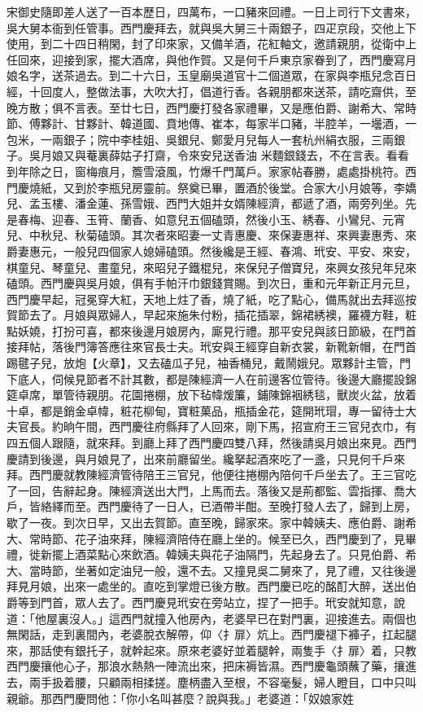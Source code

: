 宋御史隨即差人送了一百本歷日，四萬布，一口豬來回禮。一日上司行下文書來，吳大舅本衙到任管事。西門慶拜去，就與吳大舅三十兩銀子，四疋京段，交他上下使用，到二十四日稍閑，封了印來家，又備羊酒，花紅軸文，邀請親朋，從衛中上任回來，迎接到家，擺大酒席，與他作賀。又是何千戶東京家眷到了，西門慶寫月娘名字，送茶過去。到二十六日，玉皇廟吳道官十二個道眾，在家與李瓶兒念百日經，十回度人，整做法事，大吹大打，倡道行香。各親朋都來送茶，請吃齋供，至晚方散；俱不言表。至廿七日，西門慶打發各家禮畢，又是應伯爵、謝希大、常時節、傅夥計、甘夥計、韓道國、賁地傳、崔本，每家半口豬，半腔羊，一壜酒，一包米，一兩銀子；院中李桂姐、吳銀兒、鄭愛月兒每人一套杭州絹衣服，三兩銀子。吳月娘又與菴裏薛姑子打齋，令來安兒送香油 米麵銀錢去，不在言表。看看到年除之日，窗梅痕月，簷雪滾風，竹爆千門萬戶。家家帖春勝，處處掛桃符。西門慶燒紙，又到於李瓶兒房靈前。祭奠已畢，置酒於後堂。合家大小月娘等，李嬌兒、孟玉樓、潘金蓮、孫雪娥、西門大姐并女婿陳經濟，都遞了酒，兩旁列坐。先是春梅、迎春、玉筲、蘭香、如意兒五個磕頭，然後小玉、綉春、小鸞兒、元宵兒、中秋兒、秋菊磕頭。其次者來昭妻一丈青惠慶、來保妻惠祥、來興妻惠秀、來爵妻惠元，一般兒四個家人媳婦磕頭。然後纔是王經、春鴻、玳安、平安、來安，棋童兒、琴童兒、畫童兒，來昭兒子鐵棍兒，來保兒子僧寶兒，來興女孩兒年兒來磕頭。西門慶與吳月娘，俱有手帕汗巾銀錢賞賜。到次日，重和元年新正月元旦，西門慶早起，冠冕穿大紅，天地上炷了香，燒了紙，吃了點心，備馬就出去拜巡按賀節去了。月娘與眾婦人，早起來施朱付粉，插花插翠，錦裙綉襖，羅襪方鞋，粧點妖嬈，打扮可喜，都來後邊月娘房內，廝見行禮。那平安兒與該日節級，在門首接拜帖，落後門簿答應往來官長士夫。玳安與王經穿自新衣裳，新靴新帽，在門首踢毽子兒，放炮【火章】，又去磕瓜子兒，袖香桶兒，戴鬧娥兒。眾夥計主管，門下底人，伺候見節者不計其數，都是陳經濟一人在前邊客位管待。後邊大廳擺設錦筵卓席，單管待親朋。花園捲棚，放下毡幃煖簾，鋪陳錦裀綉毯，獸炭火盆，放着十卓，都是銷金卓幃，粧花柳甸，寶粧菓品，瓶插金花，筵開玳瑁，專一留待士大夫官長。約晌午間，西門慶往府縣拜了人回來，剛下馬，招宣府王三官兒衣巾，有四五個人跟隨，就來拜。到廳上拜了西門慶四雙八拜，然後請吳月娘出來見。西門慶請到後邊，與月娘見了，出來前廳留坐。纔拏起酒來吃了一盞，只見何千戶來拜。西門慶就教陳經濟管待陪王三官兒，他便往捲棚內陪何千戶坐去了。王三官吃了一回，告辭起身。陳經濟送出大門，上馬而去。落後又是荊都監、雲指揮、喬大戶，皆絡繹而至。西門慶待了一日人，已酒帶半酣。至晚打發人去了，歸到上房，歇了一夜。到次日早，又出去賀節。直至晚，歸家來。家中韓姨夫、應伯爵、謝希大、常時節、花子油來拜，陳經濟陪侍在廳上坐的。候至已久，西門慶到了，見畢禮，徙新擺上酒菜點心來飲酒。韓姨夫與花子油隔門，先起身去了。只見伯爵、希大、當時節，坐著如定油兒一般，還不去。又撞見吳二舅來了，見了禮，又往後邊拜見月娘，出來一處坐的。直吃到掌燈已後方散。西門慶已吃的酩酊大醉，送出伯爵等到門首，眾人去了。西門慶見玳安在旁站立，捏了一把手。玳安就知意，說道：「他屋裏沒人。」這西門就撞入他房內，老婆早已在對門裏，迎接進去。兩個也無閑話，走到裏間內，老婆脫衣解帶，仰〈扌扉〉炕上。西門慶褪下褲子，扛起腿來，那話使有銀托子，就幹起來。原來老婆好並着腿幹，兩隻手〈扌扉〉着，只教西門慶攘他心子，那浪水熱熱一陣流出來，把床褥皆濕。西門慶龜頭蘸了藥，攘進去，兩手扱着腰，只顧兩相揉搓。塵柄盡入至根，不容毫髮，婦人瞪目，口中只叫親爺。那西門慶問他：「你小名叫甚麼？說與我。」老婆道：「奴娘家姓